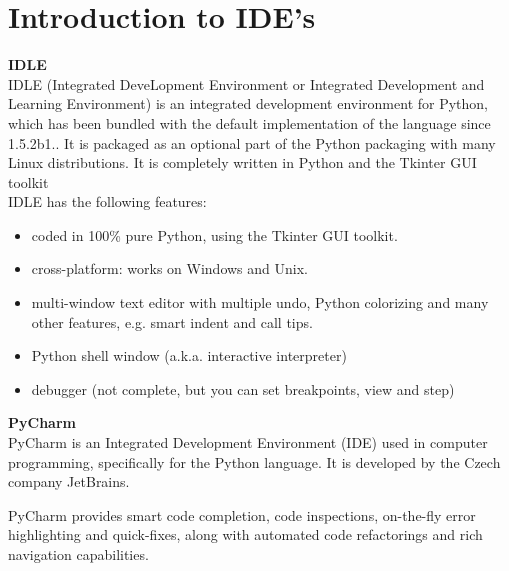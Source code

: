 \section{Introduction to IDE’s}
\textbf{{\large IDLE}}\\
IDLE (Integrated DeveLopment Environment or Integrated Development and Learning Environment) is an integrated development environment for Python, which has been bundled with the default implementation of the language since 1.5.2b1.. It is packaged as an optional part of the Python packaging with many Linux distributions. It is completely written in Python and the Tkinter GUI toolkit\\
IDLE has the following features:
\begin{itemize}
	\item coded in 100\% pure Python, using the Tkinter GUI toolkit.
	\item cross-platform: works on Windows and Unix.
	\item multi-window text editor with multiple undo, Python colorizing and many other features, e.g. smart indent and call tips.
	\item Python shell window (a.k.a. interactive interpreter)
	\item debugger (not complete, but you can set breakpoints, view and step)
\end{itemize}
\textbf{{\large PyCharm}}\\
PyCharm is an Integrated Development Environment (IDE) used in computer programming, specifically for the Python language. It is developed by the Czech company JetBrains.

PyCharm provides smart code completion, code inspections, on-the-fly error highlighting and quick-fixes, along with automated code refactorings and rich navigation capabilities.

